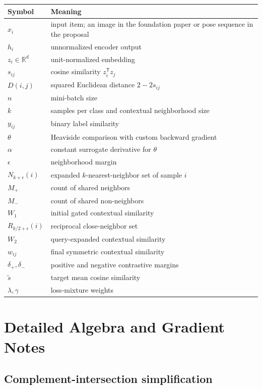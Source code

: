 \documentclass[11pt,oneside,openany]{book}
\theoremstyle{myplain}
\theoremstyle{definition}
\newcommand{\R}{\mathbb{R}}
\newcommand{\transpose}{\mathsf{T}}
\begin{document}
\begin{longtable}{>{\bfseries}p{}p{}}
\toprule
Symbol & Meaning \\
\midrule
$x_i$ & input item; an image in the foundation paper or pose sequence in the proposal \\
$h_i$ & unnormalized encoder output \\
$z_i\in\R^d$ & unit-normalized embedding \\
$s_{ij}$ & cosine similarity $z_i^\transpose z_j$ \\
$D(i,j)$ & squared Euclidean distance $2-2s_{ij}$ \\
$n$ & mini-batch size \\
$k$ & samples per class and contextual neighborhood size \\
$y_{ij}$ & binary label similarity \\
$\theta$ & Heaviside comparison with custom backward gradient \\
$\alpha$ & constant surrogate derivative for $\theta$ \\
$\epsilon$ & neighborhood margin \\
$N_{k+\epsilon}(i)$ & expanded $k$-nearest-neighbor set of sample $i$ \\
$M_+$ & count of shared neighbors \\
$M_-$ & count of shared non-neighbors \\
$W_1$ & initial gated contextual similarity \\
$R_{k/2+\epsilon}(i)$ & reciprocal close-neighbor set \\
$W_2$ & query-expanded contextual similarity \\
$w_{ij}$ & final symmetric contextual similarity \\
$\delta_+,\delta_-$ & positive and negative contrastive margins \\
$\tilde s$ & target mean cosine similarity \\
$\lambda,\gamma$ & loss-mixture weights \\
\bottomrule
\end{longtable}

\chapter{Detailed Algebra and Gradient Notes}

\section{Complement-intersection simplification}
\end{document}
